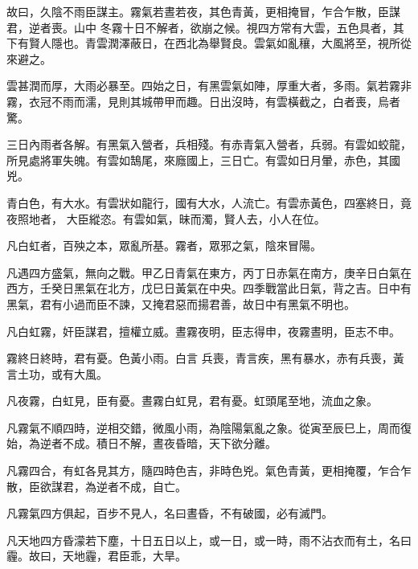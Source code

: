 \begin{pinyinscope}
 故曰，久陰不雨臣謀主。霧氣若晝若夜，其色青黃，更相掩冒，乍合乍散，臣謀君，逆者喪。山中
 冬霧十日不解者，欲崩之候。視四方常有大雲，五色具者，其下有賢人隱也。青雲潤澤蔽日，在西北為舉賢良。雲氣如亂穰，大風將至，視所從來避之。



 雲甚潤而厚，大雨必暴至。四始之日，有黑雲氣如陣，厚重大者，多雨。氣若霧非霧，衣冠不雨而濡，見則其城帶甲而趣。日出沒時，有雲橫截之，白者喪，烏者驚。



 三日內雨者各解。有黑氣入營者，兵相殘。有赤青氣入營者，兵弱。有雲如蛟龍，所見處將軍失魄。有雲如鵠尾，來廕國上，三日亡。有雲如日月暈，赤色，其國兇。



 青白色，有大水。有雲狀如龍行，國有大水，人流亡。有雲赤黃色，四塞終日，竟夜照地者，
 大臣縱恣。有雲如氣，昧而濁，賢人去，小人在位。



 凡白虹者，百殃之本，眾亂所基。霧者，眾邪之氣，陰來冒陽。



 凡遇四方盛氣，無向之戰。甲乙日青氣在東方，丙丁日赤氣在南方，庚辛日白氣在西方，壬癸日黑氣在北方，戊巳日黃氣在中央。四季戰當此日氣，背之吉。日中有黑氣，君有小過而臣不諫，又掩君惡而揚君善，故日中有黑氣不明也。



 凡白虹霧，奸臣謀君，擅權立威。晝霧夜明，臣志得申，夜霧晝明，臣志不申。



 霧終日終時，君有憂。色黃小雨。白言
 兵喪，青言疾，黑有暴水，赤有兵喪，黃言土功，或有大風。



 凡夜霧，白虹見，臣有憂。晝霧白虹見，君有憂。虹頭尾至地，流血之象。



 凡霧氣不順四時，逆相交錯，微風小雨，為陰陽氣亂之象。從寅至辰巳上，周而復始，為逆者不成。積日不解，晝夜昏暗，天下欲分離。



 凡霧四合，有虹各見其方，隨四時色吉，非時色兇。氣色青黃，更相掩覆，乍合乍散，臣欲謀君，為逆者不成，自亡。



 凡霧氣四方俱起，百步不見人，名曰晝昏，不有破國，必有滅門。



 凡天地四方昏濛若下塵，十日五日以上，或一日，或一時，雨不沾衣而有土，名曰霾。故曰，天地霾，君臣乖，大旱。




\end{pinyinscope}
